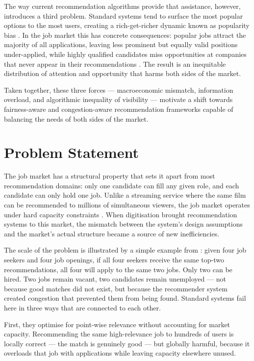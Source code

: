 The way current recommendation algorithms provide that assistance, however, introduces a third problem. Standard systems tend to surface the most popular options to the most users, creating a rich-get-richer dynamic known as popularity bias \cite{Klimashevskaia_2024}. In the job market this has concrete consequences: popular jobs attract the majority of all applications, leaving less prominent but equally valid positions under-applied, while highly qualified candidates miss opportunities at companies that never appear in their recommendations \cite{li2023feirquantifyingreducingenvy}. The result is an inequitable distribution of attention and opportunity that harms both sides of the market.

Taken together, these three forces --- macroeconomic mismatch, information overload, and algorithmic inequality of visibility --- motivate a shift towards fairness-aware and congestion-aware recommendation frameworks capable of balancing the needs of both sides of the market.

\section{Problem Statement}
\label{sec:intro:problem}

The job market has a structural property that sets it apart from most recommendation domains: only one candidate can fill any given role, and each candidate can only hold one job. Unlike a streaming service where the same film can be recommended to millions of simultaneous viewers, the job market operates under hard capacity constraints \cite{mashayekhi2023reconreducingcongestionjob}. When digitisation brought recommendation systems to this market, the mismatch between the system's design assumptions and the market's actual structure became a source of new inefficiencies.

The scale of the problem is illustrated by a simple example from \cite{mashayekhi2023reconreducingcongestionjob}: given four job seekers and four job openings, if all four seekers receive the same top-two recommendations, all four will apply to the same two jobs. Only two can be hired. Two jobs remain vacant, two candidates remain unemployed --- not because good matches did not exist, but because the recommender system created congestion that prevented them from being found. Standard systems fail here in three ways that are connected to each other.

First, they optimise for point-wise relevance without accounting for market capacity. Recommending the same high-relevance job to hundreds of users is locally correct --- the match is genuinely good --- but globally harmful, because it overloads that job with applications while leaving capacity elsewhere unused. 

